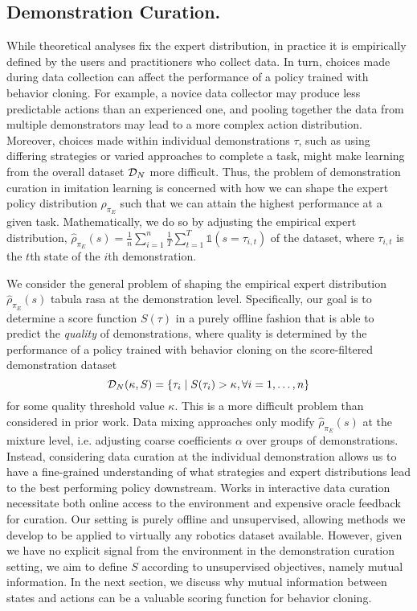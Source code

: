 \subsection{Demonstration Curation.}
While theoretical analyses fix the expert distribution, in practice it is empirically defined by the users and practitioners who collect data. In turn, choices made during data collection can affect the performance of a policy trained with behavior cloning. For example, a novice data collector may produce less predictable actions than an experienced one, and pooling together the data from multiple demonstrators may lead to a more complex action distribution. Moreover, choices made within individual demonstrations $\tau$, such as using differing strategies or varied approaches to complete a task, might make learning from the overall dataset $\mathcal{D}_N$ more difficult. Thus, the problem of demonstration curation in imitation learning is concerned with how we can shape the expert policy distribution $\rho_{\pi_E}$ such that we can attain the highest performance at a given task. Mathematically, we do so by adjusting the empirical expert distribution, $\hat{\rho}_{\pi_E}(s) = \frac{1}{n} \sum_{i=1}^n \frac{1}{T} \sum_{t=1}^T \mathds{1}(s = \tau_{i,t})$ of the dataset, where $\tau_{i,t}$ is the $t$th state of the $i$th demonstration.

We consider the general problem of shaping the empirical expert distribution $\hat{\rho}_{\pi_E}(s)$ tabula rasa at the demonstration level. Specifically, our goal is to determine a score function $S(\tau)$ in a purely offline fashion that is able to predict the \textit{quality} of demonstrations, where quality is determined by the performance of a policy trained with behavior cloning on the score-filtered demonstration dataset
\begin{equation}
    \mathcal{D}_N(\kappa, S) = \{\tau_i \mid S(\tau_i) > \kappa,  \forall i = 1, \dots, n \}
    \label{eq:filter_ds}
\end{equation}
for some quality threshold value $\kappa$. This is a more difficult problem than considered in prior work. Data mixing approaches \citet{hejna2024remix} only modify $\hat{\rho}_{\pi_E}(s)$ at the mixture level, i.e. adjusting coarse coefficients $\alpha$ over groups of demonstrations. Instead, considering data curation at the individual demonstration allows us to have a fine-grained understanding of what strategies and expert distributions lead to the best performing policy downstream. Works in interactive data curation necessitate both online access to the environment and expensive oracle feedback  \citep{hoque2021thriftydagger, cui2019uncertainty} for curation. Our setting is purely offline and unsupervised, allowing methods we develop to be applied to virtually any robotics dataset available. However, given we have no explicit signal from the environment in the demonstration curation setting, we aim to define $S$ according to unsupervised objectives, namely mutual information. In the next section, we discuss why mutual information between states and actions can be a valuable scoring function for behavior cloning.

